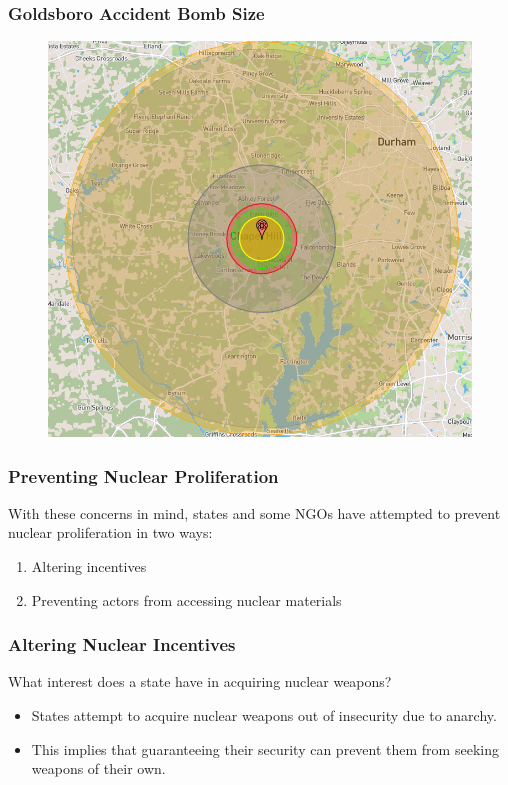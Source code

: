 \documentclass{beamer}
\begin{document}
\begin{frame} 
	\frametitle{\LARGE{Goldsboro Accident Bomb Size}}
	\begin{figure}
		\includegraphics[width=\textwidth,height=0.9\textheight,keepaspectratio]{1961accidentsize.png}
	\end{figure}
\end{frame}

\begin{frame} 
\frametitle{\LARGE{Preventing Nuclear Proliferation}}
With these concerns in mind, states and some NGOs have attempted to prevent nuclear proliferation in two ways: \pause
\begin{enumerate}
	\item Altering incentives
	\item Preventing actors from accessing nuclear materials
\end{enumerate}
\end{frame}

\begin{frame} 
\frametitle{\LARGE{Altering Nuclear Incentives}}
 What interest does a state have in acquiring nuclear weapons? \pause 
\begin{itemize}
		\item States attempt to acquire nuclear weapons out of insecurity due to anarchy. \pause
		\item This implies that guaranteeing their security can prevent them from seeking weapons of their own.
\end{itemize}
\end{frame}
\end{document}

